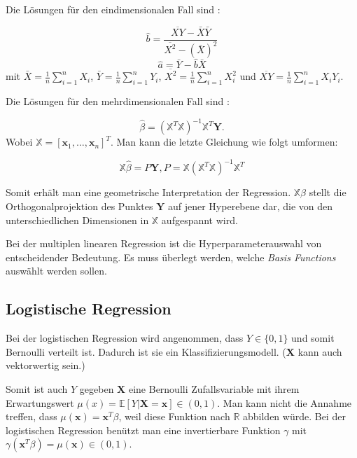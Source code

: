 Die L\"osungen f\"ur den eindimensionalen Fall sind \cite[Kapitel 13, Satz 13.4]{wasserman}:

$$ \hat{b} = \frac{\overline{XY} - \bar{X}\bar{Y}}{\overline{X^2} - (\bar{X})^2} $$
$$ \hat{a} = \bar{Y} - \hat{b}\bar{X} $$
mit $\bar{X} = \frac{1}{n} \sum_{i = 1}^n X_i$, $\bar{Y} = \frac{1}{n} \sum_{i = 1}^n Y_i$, $\overline{X^2} = \frac{1}{n} \sum_{i = 1}^n X_i^2$ und $\overline{XY} = \frac{1}{n} \sum_{i = 1}^n X_iY_i$.

Die L\"osungen f\"ur den mehrdimensionalen Fall sind \cite[Kapitel 13, Satz 13.13]{wasserman}:

$$  \hat{\beta} = (\mathbb{X}^T\mathbb{X})^{-1}\mathbb{X}^T\mathbf{Y} .$$
Wobei $\mathbb{X} = [\mathbf{x}_1, \dots, \mathbf{x}_n]^T$. Man kann die letzte Gleichung wie folgt umformen:

$$ \mathbb{X}\hat{\beta} = P\mathbf{Y}, P = \mathbb{X}(\mathbb{X}^T\mathbb{X})^{-1}\mathbb{X}^T $$

Somit erh\"alt man eine geometrische Interpretation der Regression. $\mathbb{X}\hat{\beta}$ stellt die Orthogonalprojektion des Punktes $\mathbf{Y}$ auf jener
Hyperebene dar, die von den unterschiedlichen Dimensionen in $\mathbb{X}$ aufgespannt wird.

Bei der multiplen linearen Regression ist die Hyperparameterauswahl von entscheidender Bedeutung. Es muss \"uberlegt werden, welche
\textit{Basis Functions} ausw\"ahlt werden sollen.






























\subsection{Logistische Regression}
Bei der logistischen Regression wird angenommen, dass $Y \in \{0,1\}$ und somit Bernoulli verteilt ist.
Dadurch ist sie ein Klassifizierungsmodell. ($\mathbf{X}$ kann auch vektorwertig sein.)

Somit ist auch $Y$ gegeben $\mathbf{X}$ eine Bernoulli Zufallsvariable mit ihrem Erwartungswert $\mu(x) = \mathbb{E}[Y|\mathbf{X} = \mathbf{x}] \in (0,1)$. Man kann nicht die Annahme treffen, dass
$\mu(\mathbf{x}) = \mathbf{x}^T\beta$, weil diese Funktion nach $\mathbb{R}$ abbilden w\"urde. Bei der logistischen Regression ben\"utzt man eine invertierbare Funktion $\gamma$ mit
$\gamma(\mathbf{x}^T\beta) = \mu(\mathbf{x}) \in (0,1)$.


